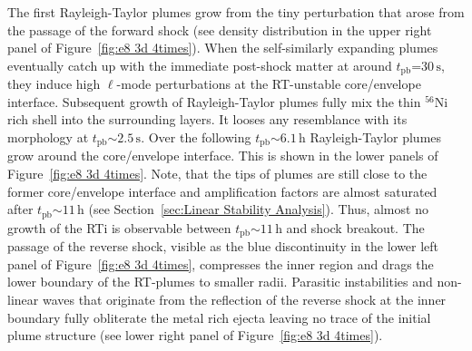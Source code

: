 \documentclass[fleqn,usenatbib]{mnras}
\newcommand{\tpb}{\ensuremath{t_{\text{pb}}}}
\newcommand{\nickel}{\ensuremath{\mathrm{^{56}Ni}}\xspace}
\newcommand{\s}{\ensuremath{\text{s}}}
\begin{document}
The first Rayleigh-Taylor plumes grow from the tiny perturbation that arose from the passage of the forward shock (see density distribution in the upper right panel of Figure~\ref{fig:e8 3d 4times}). 
When the self-similarly expanding plumes eventually catch up with the immediate post-shock matter at around $\tpb\mathord{=}30\,\s$, they induce high $\ell$-mode perturbations at the RT-unstable core/envelope interface.
Subsequent growth of Rayleigh-Taylor plumes fully mix the thin \nickel rich shell into the surrounding layers. It looses any resemblance with its morphology at $\tpb\mathord{\sim}2.5\,\s$. 
Over the following $\tpb\mathord{\sim}6.1\,\text{h}$ Rayleigh-Taylor plumes grow around the core/envelope interface. This is shown in the lower panels of Figure~\ref{fig:e8 3d 4times}.
Note, that the tips of plumes are still close to the former core/envelope interface and amplification factors are almost saturated after $\tpb\mathord{\sim}11\,\text{h}$ (see Section~\ref{sec:Linear Stability Analysis}). Thus, almost no growth of the RTi is observable between $\tpb\mathord{\sim} 11 \,\text{h}$ and shock breakout.
The passage of the reverse shock, visible as the blue discontinuity in the lower left panel of Figure~\ref{fig:e8 3d 4times}, compresses the inner region and drags the lower boundary of the RT-plumes to smaller radii. Parasitic instabilities and non-linear waves that originate from the reflection of the reverse shock at the inner boundary fully obliterate the metal rich ejecta leaving no trace of the initial plume structure (see lower right panel of Figure~\ref{fig:e8 3d 4times}). 
\end{document}
